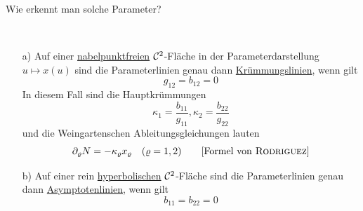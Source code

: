 Wie erkennt man solche Parameter?

\begin{satz}\label{satz246} \(\)
 \begin{enumerate}
  \item[a)] Auf einer \uline{nabelpunktfreien} \(\mathcal{C}^2\)-Fläche in der Parameterdarstellung \(u \mapsto x(u)\) sind die Parameterlinien genau dann \uline{Krümmungslinien}, wenn gilt
  \[
   g_{12} = b_{12} = 0
  \]
  In diesem Fall sind die Hauptkrümmungen
  \[
   \kappa_1 = \frac{b_{11}}{g_{11}}, \kappa_2 = \frac{b_{22}}{g_{22}}
  \]
  und die Weingartenschen Ableitungsgleichungen lauten
  \[
   \partial_\varrho N = - \kappa_\varrho x_\varrho \quad (\varrho = 1,2) \qquad [\text{Formel von \textsc{Rodriguez}}]
  \]
  \item[b)] Auf einer rein \uline{hyperbolischen} \(\mathcal{C}^2\)-Fläche sind die Parameterlinien genau dann \uline{Asymptotenlinien}, wenn gilt
  \[
   b_{11} = b_{22} = 0
  \]
 \end{enumerate}
\end{satz}

